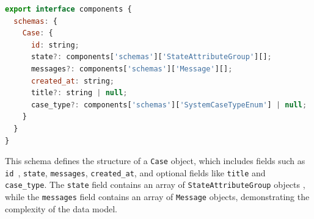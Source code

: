 \begin{lstlisting}[language=JavaScript, caption={Case Schema Definition (\texttt{v1.d.ts})},
  firstnumber=1,label={lst:case-schema}]
export interface components {
  schemas: {
    Case: {
      id: string;
      state?: components['schemas']['StateAttributeGroup'][];
      messages?: components['schemas']['Message'][];
      created_at: string;
      title?: string | null;
      case_type?: components['schemas']['SystemCaseTypeEnum'] | null;
    }
  }
}
\end{lstlisting}

This schema defines the structure of a \texttt{Case} object, which includes fields such as \texttt{id
}, \texttt{state}, \texttt{messages}, \texttt{created\_at}, and optional fields like \texttt{title} and \texttt{
case\_type}. The \texttt{state} field contains an array of \texttt{StateAttributeGroup} objects
, while the \texttt{messages} field contains an array of \texttt{Message} objects, demonstrating the
complexity of the data model.
